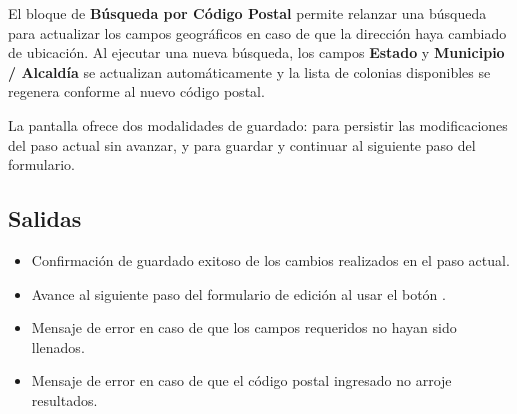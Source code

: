 El bloque de \textbf{Búsqueda por Código Postal} permite relanzar una búsqueda 
para actualizar los campos geográficos en caso de que la dirección haya 
cambiado de ubicación. Al ejecutar una nueva búsqueda, los campos \textbf{Estado} 
y \textbf{Municipio / Alcaldía} se actualizan automáticamente y la lista de 
colonias disponibles se regenera conforme al nuevo código postal.

La pantalla ofrece dos modalidades de guardado:  
para persistir las modificaciones del paso actual sin avanzar, y 
 para guardar y continuar al siguiente paso del formulario.


\subsection{Salidas}
\begin{itemize}
	\item Confirmación de guardado exitoso de los cambios realizados en el paso 
	actual.
	\item Avance al siguiente paso del formulario de edición al usar el botón 
	.
	\item Mensaje de error  en 
	caso de que los campos requeridos no hayan sido llenados.
	\item Mensaje de error  en caso 
	de que el código postal ingresado no arroje resultados.
\end{itemize}

